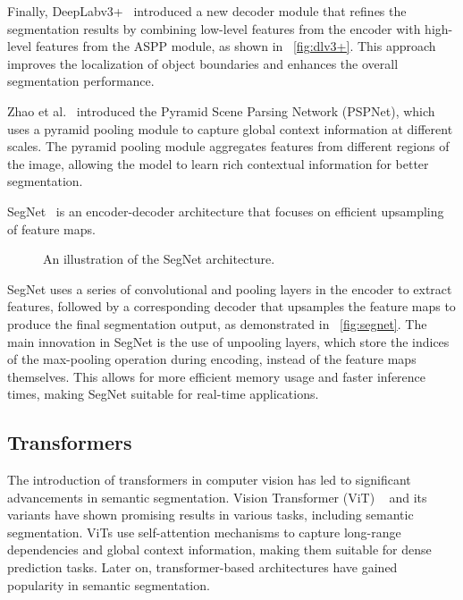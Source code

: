 Finally, DeepLabv3+~\cite{fsss_deeplabv3plus} introduced a new decoder module that refines the segmentation results by combining low-level features from the encoder with high-level features from the ASPP module, as shown in ~\autoref{fig:dlv3+}. This approach improves the localization of object boundaries and enhances the overall segmentation performance.

Zhao et al.~\cite{fsss_pspnet} introduced the Pyramid Scene Parsing Network (PSPNet), which uses a pyramid pooling module to capture global context information at different scales. The pyramid pooling module aggregates features from different regions of the image, allowing the model to learn rich contextual information for better segmentation.

SegNet~\cite{fsss_segnet} is an encoder-decoder architecture that focuses on efficient upsampling of feature maps.
\begin{figure}[htbp]
    \centering
    \caption{An illustration of the SegNet architecture.}
    \label{fig:segnet}
\end{figure}

SegNet uses a series of convolutional and pooling layers in the encoder to extract features, followed by a corresponding decoder that upsamples the feature maps to produce the final segmentation output, as demonstrated in ~\autoref{fig:segnet}. The main innovation in SegNet is the use of unpooling layers, which store the indices of the max-pooling operation during encoding, instead of the feature maps themselves. This allows for more efficient memory usage and faster inference times, making SegNet suitable for real-time applications.

\subsection{Transformers}
\label{subsec:transformers}
The introduction of transformers in computer vision has led to significant advancements in semantic segmentation. Vision Transformer (ViT) ~\cite{transformer_vit} and its variants have shown promising results in various tasks, including semantic segmentation. ViTs use self-attention mechanisms to capture long-range dependencies and global context information, making them suitable for dense prediction tasks. Later on, transformer-based architectures have gained popularity in semantic segmentation. 

